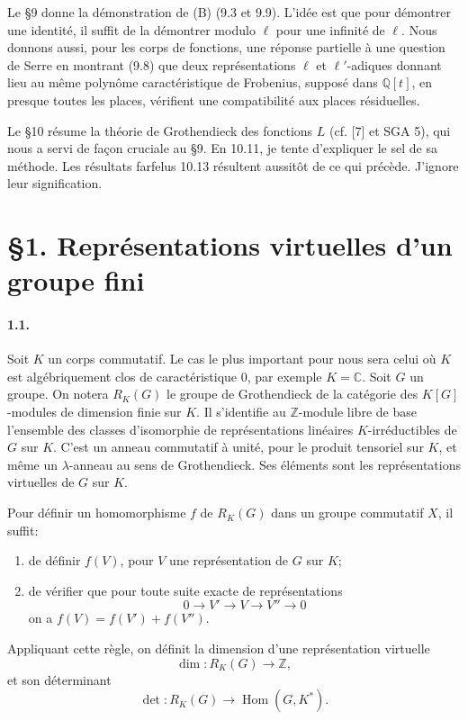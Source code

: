 \documentclass[10pt]{article}
\newcommand{\C}{\mathbb C}
\newcommand{\Q}{\mathbb Q}
\newcommand{\Z}{\mathbb Z}
\newcommand{\Hom}{\operatorname{Hom}}
\providecommand{\Hom}{\operatorname{Hom}}
\providecommand{\Hom}{\operatorname{Hom}}
\providecommand{\Hom}{\operatorname{Hom}}
\begin{document}
Le §9 donne la démonstration de (B) (9.3 et 9.9). L'idée est que pour démontrer une identité, il suffit de la démontrer modulo \(\ell\) pour une infinité de \(\ell\). Nous donnons aussi, pour les corps de fonctions, une réponse partielle à une question de Serre en montrant (9.8) que deux représentations \(\ell\) et \(\ell'\)-adiques donnant lieu au même polynôme caractéristique de Frobenius, supposé dans \(\Q[t]\), en presque toutes les places, vérifient une compatibilité aux places résiduelles.

Le §10 résume la théorie de Grothendieck des fonctions \(L\) (cf. [7] et SGA 5), qui nous a servi de façon cruciale au §9. En 10.11, je tente d'expliquer le sel de sa méthode. Les résultats farfelus 10.13 résultent aussitôt de ce qui précède. J'ignore leur signification.

\section*{\S1. Représentations virtuelles d'un groupe fini}

\paragraph{1.1.} Soit \(K\) un corps commutatif. Le cas le plus important pour nous sera celui où \(K\) est algébriquement clos de caractéristique \(0\), par exemple \(K=\C\). Soit \(G\) un groupe. On notera \(R_K(G)\) le groupe de Grothendieck de la catégorie des \(K[G]\)-modules de dimension finie sur \(K\). Il s'identifie au \(\Z\)-module libre de base l'ensemble des classes d'isomorphie de représentations linéaires \(K\)-irréductibles de \(G\) sur \(K\). C'est un anneau commutatif à unité, pour le produit tensoriel sur \(K\), et même un \(\lambda\)-anneau au sens de Grothendieck. Ses éléments sont les représentations virtuelles de \(G\) sur \(K\).

Pour définir un homomorphisme \(f\) de \(R_K(G)\) dans un groupe commutatif \(X\), il suffit:
\begin{enumerate}[label=\alph*)]
\item de définir \(f(V)\), pour \(V\) une représentation de \(G\) sur \(K\);
\item de vérifier que pour toute suite exacte de représentations
\[
0\longrightarrow V'\longrightarrow V\longrightarrow V''\longrightarrow0
\]
on a \(f(V)=f(V')+f(V'')\).
\end{enumerate}
Appliquant cette règle, on définit la dimension d'une représentation virtuelle
\[
\dim:R_K(G)\longrightarrow\Z,
\]
et son déterminant
\[
\det:R_K(G)\longrightarrow\Hom(G,K^*).
\]
\end{document}
